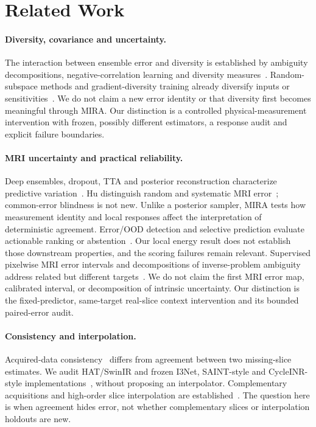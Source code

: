 \documentclass[10pt,twocolumn,letterpaper]{article}
\begin{document}
\section{Related Work}
\paragraph{Diversity, covariance and uncertainty.}
The interaction between ensemble error and diversity is established by ambiguity decompositions, negative-correlation learning and diversity measures~\cite{krogh1994ensembles,liu1999negative,kuncheva2003diversity,brown2005diversity,ortega2022diversity}. Random-subspace methods and gradient-diversity training already diversify inputs or sensitivities~\cite{ho1998subspace,kariyappa2019diversity}. We do not claim a new error identity or that diversity first becomes meaningful through MIRA. Our distinction is a controlled physical-measurement intervention with frozen, possibly different estimators, a response audit and explicit failure boundaries.

\paragraph{MRI uncertainty and practical reliability.}
Deep ensembles, dropout, TTA and posterior reconstruction characterize predictive variation~\cite{lakshminarayanan2017ensembles,gal2016dropout,wang2019tta,edupuganti2021uncertainty,narnhofer2022bayesian,luo2023diffusion}. Hu \etal distinguish random and systematic MRI error~\cite{hu2021predict}; common-error blindness is not new. Unlike a posterior sampler, MIRA tests how measurement identity and local responses affect the interpretation of deterministic agreement. Error/OOD detection and selective prediction evaluate actionable ranking or abstention~\cite{hendrycks2017baseline,geifman2017selective}. Our local energy result does not establish those downstream properties, and the scoring failures remain relevant.
Supervised pixelwise MRI error intervals and decompositions of inverse-problem ambiguity address related but different targets~\cite{giannakopoulos2026pixelwise,guo2026ambiguity}. We do not claim the first MRI error map, calibrated interval, or decomposition of intrinsic uncertainty. Our distinction is the fixed-predictor, same-target real-slice context intervention and its bounded paired-error audit.

\paragraph{Consistency and interpolation.}
Acquired-data consistency~\cite{lustig2010spirit} differs from agreement between two missing-slice estimates. We audit HAT/SwinIR and frozen I3Net, SAINT-style and CycleINR-style implementations~\cite{chen2023hat,liang2021swinir,song2024i3net,peng2020saint,fang2024cycleinr}, without proposing an interpolator. Complementary acquisitions and high-order slice interpolation are established~\cite{greenspan2002interslice,nicastro2022shift,horvath2017highorder}. The question here is when agreement hides error, not whether complementary slices or interpolation holdouts are new.
\end{document}

